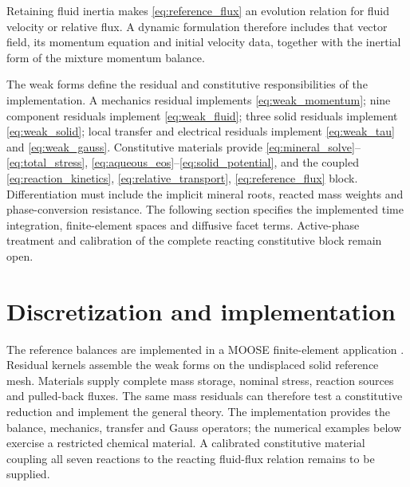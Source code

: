 \documentclass[11pt]{article}
\begin{document}
Retaining fluid inertia makes \eqref{eq:reference_flux} an evolution relation for fluid velocity or relative flux. A dynamic formulation therefore includes that vector field, its momentum equation and initial velocity data, together with the inertial form of the mixture momentum balance.

The weak forms define the residual and constitutive responsibilities of the implementation. A mechanics residual implements \eqref{eq:weak_momentum}; nine component residuals implement \eqref{eq:weak_fluid}; three solid residuals implement \eqref{eq:weak_solid}; local transfer and electrical residuals implement \eqref{eq:weak_tau} and \eqref{eq:weak_gauss}. Constitutive materials provide \eqref{eq:mineral_solve}--\eqref{eq:total_stress}, \eqref{eq:aqueous_eos}--\eqref{eq:solid_potential}, and the coupled \eqref{eq:reaction_kinetics}, \eqref{eq:relative_transport}, \eqref{eq:reference_flux} block. Differentiation must include the implicit mineral roots, reacted mass weights and phase-conversion resistance. The following section specifies the implemented time integration, finite-element spaces and diffusive facet terms. Active-phase treatment and calibration of the complete reacting constitutive block remain open.

\section{Discretization and implementation}
\label{sec:numerics}
The reference balances are implemented in a MOOSE finite-element application \citep{moose2025}. Residual kernels assemble the weak forms on the undisplaced solid reference mesh. Materials supply complete mass storage, nominal stress, reaction sources and pulled-back fluxes. The same mass residuals can therefore test a constitutive reduction and implement the general theory. The implementation provides the balance, mechanics, transfer and Gauss operators; the numerical examples below exercise a restricted chemical material. A calibrated constitutive material coupling all seven reactions to the reacting fluid-flux relation remains to be supplied.
\end{document}
